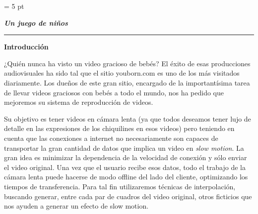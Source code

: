 
\parskip = 5 pt


\newcommand\setrow[3]{
	\setcounter{col}{1}
	\foreach \n in {#1, #2, #3} {
	\edef\x{\value{col} - 0.5}
	\edef\y{3.5 - \value{row}}
	\node[anchor=center] at (\x, \y) {\n};
	\stepcounter{col}
	}
	\stepcounter{row}
}

\newcommand\setrowaux[7]{
	\setcounter{col}{1}
	\foreach \n in {#1, #2, #3, #4, #5, #6, #7} {
	\edef\x{\value{col} - 0.5}
	\edef\y{7.5 - \value{row}}
	\node[anchor=center] at (\x, \y) {\n};
	\stepcounter{col}
	}
	\stepcounter{row}
}

\newcommand{\real}{\mathbb{R}}

%
\begin{center}
\vskip 10pt
\textbf{\Large \emph{Un juego de niños}}\\
\vspace{0.5cm}
\end{center}

\vskip 10pt
\hrule
\vskip 5pt

{\bf\noindent Introducci\'on}

¿Quién nunca ha visto un video gracioso de bebés? El éxito de esas producciones audiovisuales ha sido tal que el sitio youborn.com es uno de los más visitados diariamente. Los dueños de este gran sitio, encargado de la importantísima tarea de llevar videos graciosos con bebés a todo el mundo, nos ha pedido que mejoremos su sistema de reproducción de videos.

Su objetivo es tener videos en cámara lenta (ya que todos deseamos tener lujo de detalle en las expresiones de los chiquilines en esos videos) pero teniendo en cuenta que las conexiones a internet no necesariamente son capaces de transportar la gran cantidad de datos que implica un video en \textit{slow motion}. La gran idea es minimizar la dependencia de la velocidad de conexi\'on y s\'olo enviar el video original. Una vez que el usuario recibe esos datos, todo el trabajo de la cámara lenta puede hacerse de modo offline del lado del cliente, optimizando los tiempos de transferencia. Para tal fin utilizaremos técnicas de interpolación, buscando generar, entre cada par de cuadros del video original, otros ficticios que nos ayuden a generar un efecto de slow motion.


